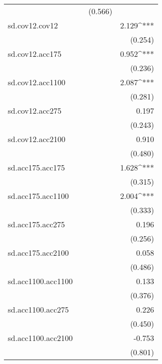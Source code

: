 \begin{tabular}{lD{.}{.}{3}D{.}{.}{3}D{.}{.}{3}}
                   &              & (0.566)      &             \\
sd.cov12.cov12     &              &              &  2.129^{***}\\
                   &              &              & (0.254)     \\
sd.cov12.acc175    &              &              &  0.952^{***}\\
                   &              &              & (0.236)     \\
sd.cov12.acc1100   &              &              &  2.087^{***}\\
                   &              &              & (0.281)     \\
sd.cov12.acc275    &              &              &  0.197      \\
                   &              &              & (0.243)     \\
sd.cov12.acc2100   &              &              &  0.910      \\
                   &              &              & (0.480)     \\
sd.acc175.acc175   &              &              &  1.628^{***}\\
                   &              &              & (0.315)     \\
sd.acc175.acc1100  &              &              &  2.004^{***}\\
                   &              &              & (0.333)     \\
sd.acc175.acc275   &              &              &  0.196      \\
                   &              &              & (0.256)     \\
sd.acc175.acc2100  &              &              &  0.058      \\
                   &              &              & (0.486)     \\
sd.acc1100.acc1100 &              &              &  0.133      \\
                   &              &              & (0.376)     \\
sd.acc1100.acc275  &              &              &  0.226      \\
                   &              &              & (0.450)     \\
sd.acc1100.acc2100 &              &              & -0.753      \\
                   &              &              & (0.801)     \\

\end{tabular}
